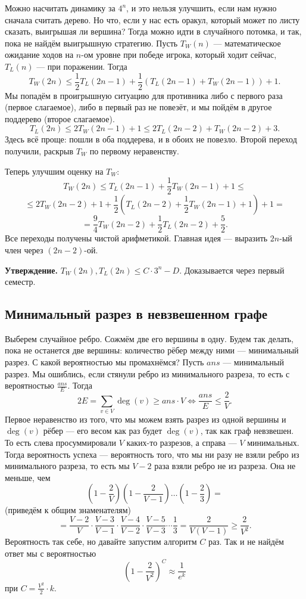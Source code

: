 Можно насчитать динамику за $4^n$, и это нельзя улучшить, если нам нужно сначала считать дерево.
Но что, если у нас есть оракул, который может по листу сказать, выигрышая ли вершина?
Тогда можно идти в случайного потомка, и так, пока не найдём выигрышную стратегию.
Пусть $T_W(n)$ --- математическое ожидание ходов на $n$-ом уровне при победе игрока, который ходит сейчас, $T_L(n)$ --- при поражении.
Тогда
\[
    T_W(2n) \le \frac{1}{2} T_L(2n-1) + \frac{1}{2} (T_L(2n - 1) + T_W(2n-1)) + 1.
\]
Мы попадём в проигрышную ситуацию для противника либо с первого раза (первое слагаемое), либо в первый раз не повезёт, и мы пойдём в другое поддерево (второе слагаемое).
\[
    T_L(2n) \le 2T_W(2n-1) + 1 \le 2T_L(2n-2) + T_W(2n-2) + 3.
\]
Здесь всё проще: пошли в оба поддерева, и в обоих не повезло.
Второй переход получили, раскрыв $T_W$ по первому неравенству.

Теперь улучшим оценку на $T_W$:
\[
    T_W(2n) \le T_L(2n-1) + \frac{1}{2} T_W(2n-1) + 1 \le 
\]
\[
    \le 2T_W(2n-2) + 1 + \frac{1}{2} (T_L(2n-2) + \frac{1}{2} T_W(2n-1) + 1) + 1 =
\]
\[
    = \frac{9}{4} T_W(2n-2) + \frac{1}{2} T_L(2n-2) + \frac{5}{2}.
\]
Все переходы получены чистой арифметикой.
Главная идея --- выразить $2n$-ый член через $(2n-2)$-ой.

\textbf{Утверждение.} $T_W(2n), T_L(2n) \le C \cdot 3^n - D$. Доказывается через первый семестр.

\subsection{Минимальный разрез в невзвешенном графе}
Выберем случайное ребро.
Сожмём две его вершины в одну.
Будем так делать, пока не останется две вершины: количество рёбер между ними --- минимальный разрез.
С какой вероятностью мы промахнёмся? Пусть $ans$ --- минимальный разрез.
Мы ошиблись, если стянули ребро из минимального разреза, то есть с вероятностью $\frac{ans}{E}$.
Тогда
\[
    2E = \sum_{v \in V} \deg(v) \ge ans \cdot V \iff \frac{ans}{E} \le \frac{2}{V}.
\]
Первое неравенство из того, что мы можем взять разрез из одной вершины и $\deg(v)$ рёбер --- его весом как раз будет $\deg(v)$, так как граф невзвешен.
То есть слева просуммировали $V$ каких-то разрезов, а справа --- $V$ минимальных.
Тогда вероятность успеха --- вероятность того, что мы ни разу не взяли ребро из минимального разреза, то есть мы $V - 2$ раза взяли ребро не из разреза.
Она не меньше, чем
\[
    \left(1 - \frac{2}{V} \right) \left( 1 - \frac{2}{V - 1} \right) \dots \left(1 - \frac{2}{3} \right) =
\]
(приведём к общим знаменателям)
\[
    = \frac{V - 2}{V} \cdot \frac{V - 3}{V - 1} \cdot \frac{V - 4}{V - 2} \cdot \frac{V - 5}{V - 3} \cdots \frac{1}{3} = \frac{2}{V(V-1)} \ge \frac{2}{V^2}.
\]
Вероятность так себе, но давайте запустим алгоритм $C$ раз.
Так и не найдём ответ мы с вероятностью
\[
    \left(1 - \frac{2}{V^2} \right)^C \approx \frac{1}{e^k}
\]
при $C = \frac{V^2}{2} \cdot k$.

